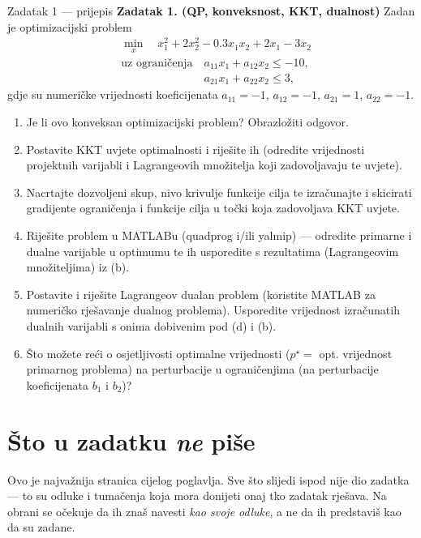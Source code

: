 \begin{zadatak}{Zadatak 1 --- prijepis}
\textbf{Zadatak 1. (QP, konveksnost, KKT, dualnost)} Zadan je optimizacijski problem
\begin{align}
&\min_{x} \quad x_1^2 + 2x_2^2 - 0.3x_1x_2 + 2x_1 - 3x_2 \tag{1a} \\
&\text{uz ograničenja} \quad a_{11}x_1 + a_{12}x_2 \leq -10, \tag{1b} \\
&\phantom{\text{uz ograničenja}} \quad a_{21}x_1 + a_{22}x_2 \leq 3, \tag{1c}
\end{align}
gdje su numeričke vrijednosti koeficijenata
$a_{11} = -1$, $a_{12} = -1$, $a_{21} = 1$, $a_{22} = -1$.

\begin{enumerate}[label=\alph*),leftmargin=*]
  \item Je li ovo konveksan optimizacijski problem? Obrazložiti odgovor.
  \item Postavite KKT uvjete optimalnosti i riješite ih (odredite vrijednosti
        projektnih varijabli i Lagrangeovih množitelja koji zadovoljavaju te uvjete).
  \item Nacrtajte dozvoljeni skup, nivo krivulje funkcije cilja te izračunajte i
        skicirati gradijente ograničenja i funkcije cilja u točki koja zadovoljava
        KKT uvjete.
  \item Riješite problem u MATLABu (quadprog i/ili yalmip) --- odredite primarne i
        dualne varijable u optimumu te ih usporedite s rezultatima (Lagrangeovim
        množiteljima) iz (b).
  \item Postavite i riješite Lagrangeov dualan problem (koristite MATLAB za
        numeričko rješavanje dualnog problema). Usporedite vrijednost izračunatih
        dualnih varijabli s onima dobivenim pod (d) i (b).
  \item Što možete reći o osjetljivosti optimalne vrijednosti ($p^\star =$ opt.
        vrijednost primarnog problema) na perturbacije u ograničenjima (na
        perturbacije koeficijenata $b_1$ i $b_2$)?
\end{enumerate}
\end{zadatak}

\section{Što u zadatku \emph{ne} piše}
\label{sec:z1-nije-receno}

Ovo je najvažnija stranica cijelog poglavlja. Sve što slijedi ispod nije dio
zadatka --- to su odluke i tumačenja koja mora donijeti onaj tko zadatak rješava.
Na obrani se očekuje da ih znaš navesti \emph{kao svoje odluke}, a ne da ih
predstaviš kao da su zadane.

